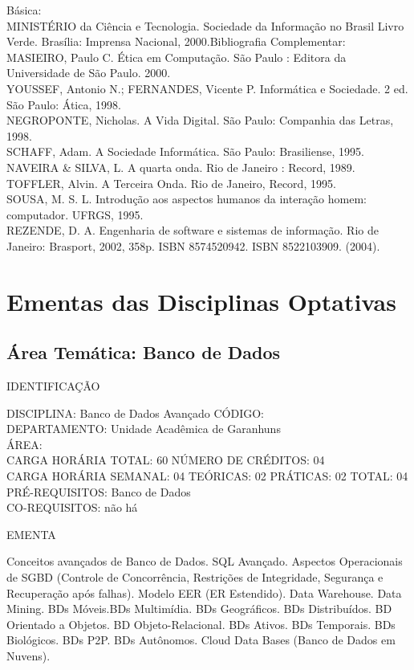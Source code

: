 \documentclass[
	12pt,				%
	openright,			%
  oneside,     %
	a4paper,			%
	english,			%
	french,				%
	spanish,			%
	brazil				%
	]{abntex2}
\begin{document}
\begin{apendicesenv}
Básica:\\
MINISTÉRIO da Ciência e Tecnologia. Sociedade da Informação 
no Brasil  Livro Verde. Brasília: Imprensa Nacional,
2000.Bibliografia
Complementar:\\
MASIEIRO, Paulo C. Ética em Computação. São Paulo : Editora da
Universidade de São Paulo. 2000.\\
YOUSSEF, Antonio N.; FERNANDES, Vicente P. Informática e Sociedade. 2
ed. São Paulo: Ática, 1998.\\
NEGROPONTE, Nicholas. A Vida Digital. São Paulo: Companhia das Letras,
1998.\\
SCHAFF, Adam. A Sociedade Informática. São Paulo: Brasiliense, 1995.\\
NAVEIRA \& SILVA, L. A quarta onda. Rio de Janeiro : Record, 1989.\\
TOFFLER, Alvin. A Terceira Onda. Rio de Janeiro, Record, 1995.\\
SOUSA, M. S. L. Introdução aos aspectos humanos da 
interação homem: computador. UFRGS, 1995. \\
REZENDE, D. A. Engenharia de software e sistemas de informação. Rio de Janeiro: Brasport, 2002,
358p. ISBN 8574520942. ISBN 8522103909. (2004).


\chapter{Ementas das Disciplinas Optativas}

\section*{Área Temática: Banco de Dados}

IDENTIFICAÇÃO

DISCIPLINA: Banco de Dados Avançado CÓDIGO:\\
DEPARTAMENTO: Unidade Acadêmica de Garanhuns\\
ÁREA: \\
CARGA HORÁRIA TOTAL: 60 NÚMERO DE CRÉDITOS: 04\\
CARGA HORÁRIA SEMANAL: 04 TEÓRICAS: 02 PRÁTICAS: 02 TOTAL: 04\\
PRÉ-REQUISITOS: Banco de Dados\\
CO-REQUISITOS: não há

EMENTA 

Conceitos avançados de Banco de Dados. SQL Avançado. Aspectos
Operacionais de SGBD (Controle de Concorrência, Restrições de
Integridade, Segurança e Recuperação após falhas). Modelo EER (ER
Estendido). Data Warehouse. Data Mining. BDs Móveis.BDs Multimídia. BDs Geográficos. BDs Distribuídos. BD Orientado a
Objetos. BD Objeto-Relacional. BDs Ativos. BDs Temporais. BDs
Biológicos. BDs P2P. BDs Autônomos. Cloud Data Bases (Banco de Dados em
Nuvens).


\end{apendicesenv}
\end{document}
